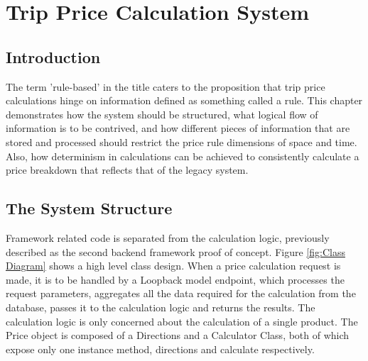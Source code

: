 \graphicspath{{Chapter4/Figs/Vector/}{Chapter4/Figs/}}

\chapter{Trip Price Calculation System}
\section{Introduction}
The term 'rule-based' in the title caters to the proposition that trip price calculations hinge on information defined as something called a rule. This chapter demonstrates how the system should be structured, what logical flow of information is to be contrived, and how different pieces of information that are stored and processed should restrict the price rule dimensions of space and time. Also, how determinism in calculations can be achieved to consistently calculate a price breakdown that reflects that of the legacy system.

\section{The System Structure}
Framework related code is separated from the calculation logic, previously described as the second backend framework proof of concept. Figure \ref{fig:Class Diagram} shows a high level class design. When a price calculation request is made, it is to be handled by a Loopback model endpoint, which processes the request parameters, aggregates all the data required for the calculation from the database, passes it to the calculation logic and returns the results. The calculation logic is only concerned about the calculation of a single product. The Price object is composed of a Directions and a Calculator Class, both of which expose only one instance method, directions and calculate respectively.

